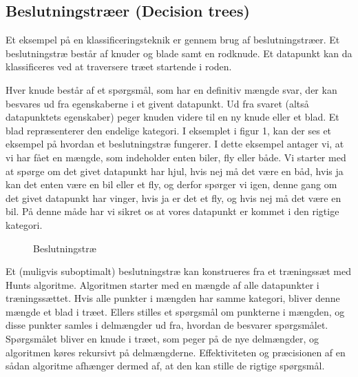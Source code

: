 \documentclass{article}
\begin{document}
\subsection{Beslutningstræer (Decision trees)}
Et eksempel på en klassificeringsteknik er gennem brug af beslutningstræer. Et beslutningstræ består af knuder og blade samt en rodknude. Et datapunkt kan da klassificeres ved at traversere træet startende i roden.

Hver knude består af et spørgsmål, som har en definitiv mængde svar, der kan besvares ud fra egenskaberne i et givent datapunkt. Ud fra svaret (altså datapunktets egenskaber) peger knuden videre til en ny knude eller et blad. Et blad repræsenterer den endelige kategori. I eksemplet i figur 1, kan der ses et eksempel på hvordan et beslutningstræ fungerer. I dette eksempel antager vi, at vi har fået en mængde, som indeholder enten biler, fly eller både. Vi starter med at spørge om det givet datapunkt har hjul, hvis nej må det være en båd, hvis ja kan det enten være en bil eller et fly, og derfor spørger vi igen, denne gang om det givet datapunkt har vinger, hvis ja er det et fly, og hvis nej må det være en bil. På denne måde har vi sikret os at vores datapunkt er kommet i den rigtige kategori.

\begin{figure}[H]
\begin{center}
\end{center}
\caption{Beslutningstræ}
\end{figure}

Et (muligvis suboptimalt) beslutningstræ kan konstrueres fra et træningssæt med Hunts algoritme. Algoritmen starter med en mængde af alle datapunkter i træningssættet. Hvis alle punkter i mængden har samme kategori, bliver denne mængde et blad i træet. Ellers stilles et spørgsmål om punkterne i mængden, og disse punkter samles i delmængder ud fra, hvordan de besvarer spørgsmålet. Spørgsmålet bliver en knude i træet, som peger på de nye delmængder, og algoritmen køres rekursivt på delmængderne. Effektiviteten og præcisionen af en sådan algoritme afhænger dermed af, at den kan stille de rigtige spørgsmål.
\end{document}
